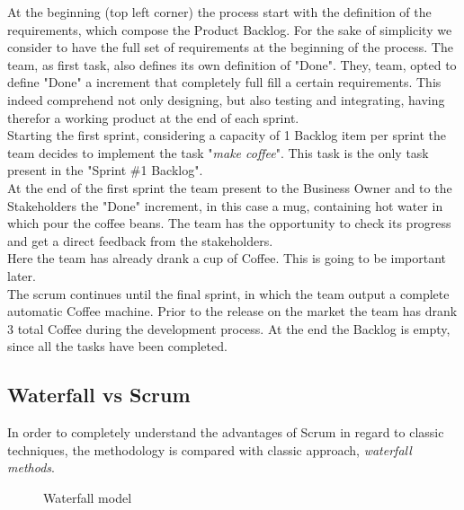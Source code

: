 \documentclass[../main.tex]{subfiles}
\newcommand\connectow[2]%
  {\draw[thick, ->] (#1) |- (#2);
  }
\begin{document}
At the beginning (top left corner) the process start with the definition of the requirements, which compose the Product Backlog. For the sake of simplicity we consider to have the full set of requirements at the beginning of the process. The team, as first task, also defines its own definition of "Done". They, team, opted to define "Done" a increment that completely full fill a certain requirements. This indeed comprehend not only designing, but also testing and integrating, having therefor a working product at the end of each sprint.\\
Starting the first sprint, considering a capacity of 1 Backlog item per sprint the team decides to implement the task "\textit{make coffee}". This task is the only task present in the "Sprint \#1 Backlog". \\
At the end of the first sprint the team present to the Business Owner and to the Stakeholders the "Done" increment, in this case a mug, containing hot water in which pour the coffee beans. The team has the opportunity to check its progress and get a direct feedback from the stakeholders.\\ Here the team has already drank a cup of Coffee. This is going to be important later.\\ The scrum continues until the final sprint, in which the team output a complete automatic Coffee machine. Prior to the release on the market the team has drank 3 total Coffee during the development process. At the end the Backlog is empty, since all the tasks have been completed. 
\subsection{Waterfall vs Scrum}
In order to completely understand the advantages of Scrum in regard to classic techniques, the methodology is compared with classic approach, \textit{waterfall methods}.
\begin{figure}[H]
\centering
\caption{Waterfall model}
\end{figure}
\end{document}
